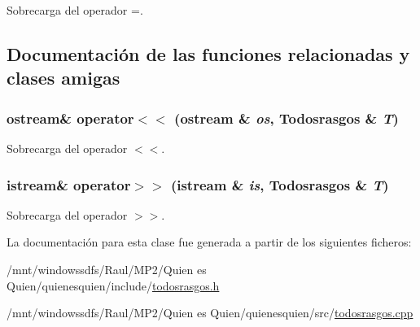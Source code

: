 Sobrecarga del operador =. 



\subsection{Documentación de las funciones relacionadas y clases amigas}
\hypertarget{class_todosrasgos_f668c78e104d9dd9ae3a3639709227b9}{
\subsubsection[{operator$<$$<$}]{\setlength{\rightskip}{0pt plus 5cm}ostream\& operator$<$$<$ (ostream \& {\em os}, \/  {\bf Todosrasgos} \& {\em T})}}
\label{class_todosrasgos_f668c78e104d9dd9ae3a3639709227b9}


Sobrecarga del operador $<$$<$. 

\hypertarget{class_todosrasgos_b10d8e2982f53857984555835f8b0c39}{
\subsubsection[{operator$>$$>$}]{\setlength{\rightskip}{0pt plus 5cm}istream\& operator$>$$>$ (istream \& {\em is}, \/  {\bf Todosrasgos} \& {\em T})}}
\label{class_todosrasgos_b10d8e2982f53857984555835f8b0c39}


Sobrecarga del operador $>$$>$. 



La documentación para esta clase fue generada a partir de los siguientes ficheros:\begin{CompactItemize}
\item 
/mnt/windowssdfs/Raul/MP2/Quien es Quien/quienesquien/include/\hyperlink{todosrasgos_8h}{todosrasgos.h}\item 
/mnt/windowssdfs/Raul/MP2/Quien es Quien/quienesquien/src/\hyperlink{todosrasgos_8cpp}{todosrasgos.cpp}\end{CompactItemize}
